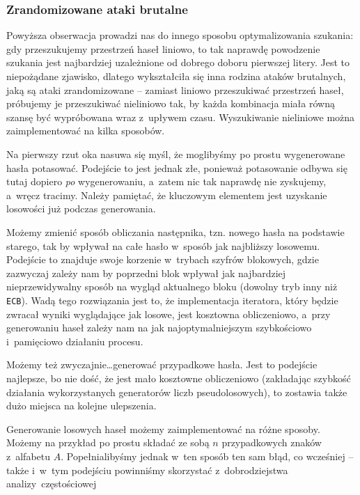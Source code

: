 \documentclass[12pt,a4paper,twoside]{article}
\begin{document}
\subsubsection{Zrandomizowane ataki brutalne}
Powyższa obserwacja prowadzi nas do innego sposobu optymalizowania szukania:
gdy przeszukujemy przestrzeń haseł liniowo, to tak naprawdę powodzenie szukania
jest najbardziej uzależnione od dobrego doboru pierwszej litery. Jest to
niepożądane zjawisko, dlatego wykształciła się inna rodzina ataków brutalnych,
jaką są ataki zrandomizowane -- zamiast liniowo przeszukiwać przestrzeń haseł,
próbujemy je przeszukiwać nieliniowo tak, by każda kombinacja miała równą
szansę być wypróbowana wraz z~upływem czasu. Wyszukiwanie nieliniowe można
zaimplementować na kilka sposobów.
\begin{myenumerate}
    \item Na pierwszy rzut oka nasuwa się myśl, że moglibyśmy po prostu
    wygenerowane hasła potasować. Podejście to jest jednak złe, ponieważ
    potasowanie odbywa się tutaj dopiero \emph{po} wygenerowaniu, a~zatem nic
    tak naprawdę nie zyskujemy, a~wręcz tracimy. Należy pamiętać, że kluczowym
    elementem jest uzyskanie losowości już podczas generowania.
    \item Możemy zmienić sposób obliczania następnika, tzn. nowego hasła na
    podstawie starego, tak by wpływał na całe hasło w~sposób jak najbliższy
    losowemu. Podejście to znajduje swoje korzenie w~trybach szyfrów blokowych,
    gdzie zazwyczaj zależy nam by poprzedni blok wpływał jak najbardziej
    nieprzewidywalny sposób na wygląd aktualnego bloku (dowolny tryb inny niż
    \texttt{ECB}). Wadą tego rozwiązania jest to, że implementacja iteratora,
    który będzie zwracał wyniki wyglądające jak losowe, jest kosztowna
    obliczeniowo, a~przy generowaniu haseł zależy nam na jak najoptymalniejszym
    szybkościowo i~pamięciowo działaniu procesu.
    \item Możemy też zwyczajnie\ldots generować przypadkowe hasła. Jest to
    podejście najlepsze, bo nie dość, że jest mało kosztowne obliczeniowo
    (zakładając szybkość działania wykorzystanych generatorów liczb
    pseudolosowych), to zostawia także dużo miejsca na kolejne ulepszenia.
\end{myenumerate}
Generowanie losowych haseł możemy zaimplementować na różne sposoby. Możemy na
przykład po prostu składać ze sobą $n$ przypadkowych znaków z~alfabetu $A$.
Popełnialibyśmy jednak w~ten sposób ten sam błąd, co wcześniej -- także i~w~tym
podejściu powinniśmy skorzystać z~dobrodziejstwa analizy~częstościowej
\end{document}
